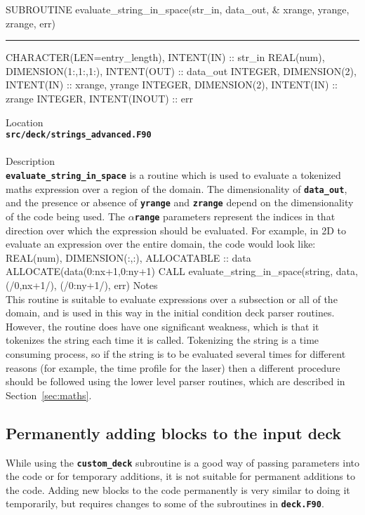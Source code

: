 \documentclass[12pt,a4paper]{article}
\newcommand{\HRule}{\rule[0.3cm]{\linewidth}{0.5mm}}
\newcommand{\inlinecode}[1]{{\color{warwickred} \bf\texttt{#1}}}
\newenvironment{boxverbatim}{\lboxverbatim{none}}{\endlboxverbatim}
\begin{document}
\pagebreak
\begin{codedef}
SUBROUTINE evaluate_string_in_space(str_in, data_out, &
    xrange, {yrange}, {zrange}, err)
\HRule
CHARACTER(LEN=entry_length), INTENT(IN) :: str_in
REAL(num), DIMENSION(1:,{1:},{1:}), INTENT(OUT) :: data_out
INTEGER, DIMENSION(2), INTENT(IN) :: xrange, {yrange}
INTEGER, DIMENSION(2), INTENT(IN) :: {zrange}
INTEGER, INTENT(INOUT) :: err
\end{codedef}
\vspace{1cm}
{\Large Location\\}
\inlinecode{src/deck/strings\_advanced.F90}\\
\\[0.5cm]
{\Large Description\\}
\inlinecode{evaluate\_string\_in\_space} is a routine which is used to evaluate
a tokenized maths expression over a region of the domain. The dimensionality of
\inlinecode{data\_out}, and the presence or absence of \inlinecode{yrange} and
\inlinecode{zrange} depend on the dimensionality of the code being used. The
\inlinecode{{\it $\alpha$}range} parameters represent the indices in that
direction over which the expression should be evaluated. For example, in 2D to
evaluate an expression over the entire domain, the code would look like:
\begin{boxverbatim}
REAL(num), DIMENSION(:,:), ALLOCATABLE :: data
ALLOCATE(data(0:nx+1,0:ny+1)
CALL evaluate_string_in_space(string, data, (/0,nx+1/), (/0:ny+1/), err)
\end{boxverbatim}
{\Large Notes\\}
This routine is suitable to evaluate expressions over a subsection or all of
the domain, and is used in this way in the initial condition deck parser
routines. However, the routine does have one significant weakness, which is
that it tokenizes the string each time it is called. Tokenizing the string is a
time consuming process, so if the string is to be evaluated several times for
different reasons (for example, the time profile for the laser) then a
different procedure should be followed using the lower level parser routines,
which are described in Section~\ref{sec:maths}.
\pagebreak

\subsection{Permanently adding blocks to the input deck}

While using the \inlinecode{custom\_deck} subroutine is a good way of passing
parameters into the code or for temporary additions, it is not suitable for
permanent additions to the code. Adding new blocks to the code permanently is
very similar to doing it temporarily, but requires changes to some of the
subroutines in \inlinecode{deck.F90}.\\
\end{document}
